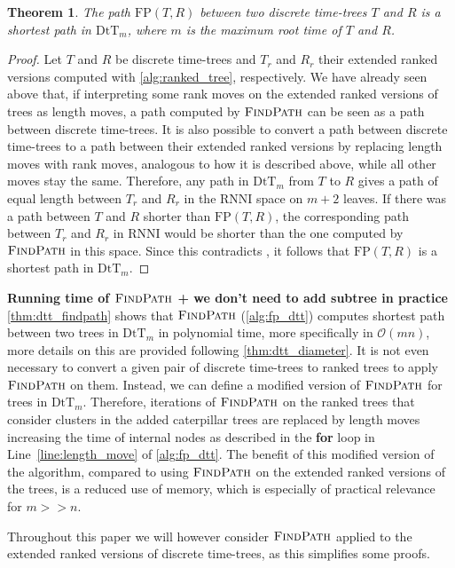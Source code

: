 \documentclass[11pt]{amsart}
\newtheorem{theorem}{Theorem}
\newcommand{\rnni}{\mathrm{RNNI}}
\newcommand{\findpath}{\textsc{FindPath}}
\newcommand{\fp}{\mathrm{FP}}
\newcommand{\dtt}{\mathrm{DtT}}
\renewcommand{\O}{\mathcal O}
\newcommand{\summary}[1]{\textbf{#1}} %
\begin{document}
\begin{theorem}
	The path $\fp(T,R)$ between two discrete time-trees $T$ and $R$ is a shortest path in $\dtt_m$, where $m$ is the maximum root time of $T$ and $R$.
	\label{thm:dtt_findpath}
\end{theorem}

\begin{proof}
	Let $T$ and $R$ be discrete time-trees and $T_r$ and $R_r$ their extended ranked versions computed with \autoref{alg:ranked_tree}, respectively.
	We have already seen above that, if interpreting some rank moves on the extended ranked versions of trees as length moves, a path computed by $\findpath$ can be seen as a path between discrete time-trees.
	It is also possible to convert a path between discrete time-trees to a path between their extended ranked versions by replacing length moves with rank moves, analogous to how it is described above, while all other moves stay the same.
	Therefore, any path in $\dtt_m$ from $T$ to $R$ gives a path of equal length between $T_r$ and $R_r$ in the $\rnni$ space on $m+2$ leaves.
	If there was a path between $T$ and $R$ shorter than $\fp(T,R)$, the corresponding path between $T_r$ and $R_r$ in $\rnni$ would be shorter than the one computed by $\findpath$ in this space.
	Since this contradicts \autocite[Theorem 1]{Collienne2020-iu}, it follows that $\fp(T,R)$ is a shortest path in $\dtt_m$.
\end{proof}

\summary{Running time of $\findpath$ + we don't need to add subtree in practice}
\autoref{thm:dtt_findpath} shows that $\findpath$ (\autoref{alg:fp_dtt}) computes shortest path between two trees in $\dtt_m$ in polynomial time, more specifically in $\O(mn)$, more details on this are provided following \autoref{thm:dtt_diameter}.
It is not even necessary to convert a given pair of discrete time-trees to ranked trees to apply $\findpath$ on them.
Instead, we can define a modified version of $\findpath$ for trees in $\dtt_m$.
Therefore, iterations of $\findpath$ on the ranked trees that consider clusters in the added caterpillar trees are replaced by length moves increasing the time of internal nodes as described in the \textbf{for} loop in Line~\ref{line:length_move} of \autoref{alg:fp_dtt}.
The benefit of this modified version of the algorithm, compared to using $\findpath$ on the extended ranked versions of the trees, is a reduced use of memory, which is especially of practical relevance for $m >> n$.

Throughout this paper we will however consider $\findpath$ applied to the extended ranked versions of discrete time-trees, as this simplifies some proofs.
\end{document}
